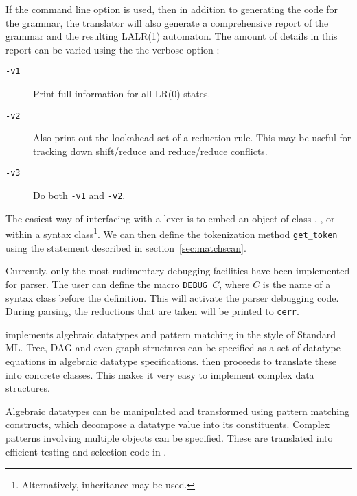 
If the command line option  is used, then
in addition to generating the code for the grammar, the translator
will also generate a comprehensive report of the grammar and
the resulting LALR(1) automaton.  The amount of details in this
report can be varied using the the verbose option
:

\begin{description}
   \item[{\tt -v1}]  Print full information for all LR(0) states. 
   \item[{\tt -v2}]  Also print out the lookahead set of a reduction rule.
This may be useful for tracking down shift/reduce and reduce/reduce conflicts.
   \item[{\tt -v3}]  Do both \verb|-v1| and \verb|-v2|.
\end{description}


The easiest way of interfacing with a lexer is to embed
an object of class , , or 
within a syntax class\footnote{Alternatively, inheritance may be used.}.
We can then define the tokenization method
\verb|get_token| using the  statement described
in section~\ref{sec:matchscan}.


Currently, only the most rudimentary debugging facilities have been
implemented for parser.
The user can define the macro \verb|DEBUG_|$C$, where $C$ is the
name of a syntax class before the  definition.  This will activate
the parser debugging code.  During parsing, the reductions that are taken
will be printed to \verb|cerr|.

 \label{sec:datatype}

    \Prop{} implements algebraic datatypes and pattern matching in the
style of Standard ML\cite{SML}.  Tree, DAG and even graph structures can be
specified as a set of datatype equations in algebraic datatype specifications.
\Prop{} then proceeds to translate these into concrete \Cpp{} classes.  
This makes it very easy to implement complex data structures.

   Algebraic datatypes can be manipulated and transformed
using \Prop{} pattern matching constructs, which decompose a datatype
value into its constituents.  Complex patterns involving multiple
objects can be specified.  These are translated into efficient 
testing and selection code in \Cpp.

